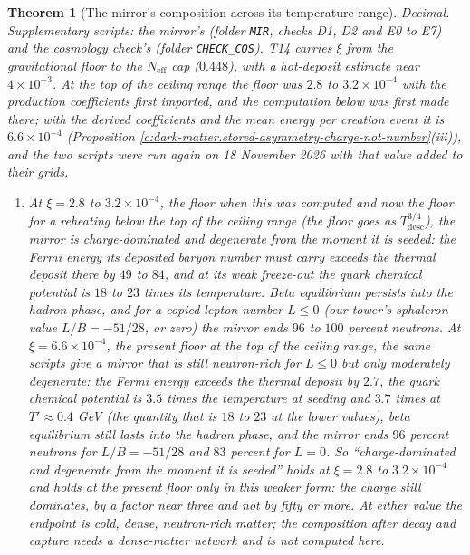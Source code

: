 \documentclass[11pt]{article}
\newtheorem{theorem}{Theorem}[section]
\theoremstyle{definition}
\theoremstyle{plain}
\newcommand{\changedmark}[2]{\marginpar{\raggedright\scriptsize\color{#1}#2}}
\providecommand{\Neff}{}\renewcommand{\Neff}{N_{\mathrm{eff}}}
\providecommand{\file}{}\renewcommand{\file}[1]{\texttt{#1}}
\begin{document}
\begin{theorem}[The mirror's composition across its temperature range]\label{c:dark-tower-matter.mirrors-composition}
\changedmark{BurntOrange}{changed since the deposit}
Decimal. Supplementary scripts: the mirror's (folder \file{MIR}, checks D1, D2 and E0 to E7) and the cosmology check's (folder \file{CHECK\_COS}). T14 carries $\xi$ from the gravitational floor to the $\Neff$ cap ($0.448$), with a hot-deposit estimate near $4 \times 10^{-3}$. At the top of the ceiling range the floor was $2.8$ to $3.2 \times 10^{-4}$ with the production coefficients first imported, and the computation below was first made there; with the derived coefficients and the mean energy per creation event it is $6.6 \times 10^{-4}$ (Proposition \ref{c:dark-matter.stored-asymmetry-charge-not-number}(iii)), and the two scripts were run again on 18 November 2026 with that value added to their grids.
\begin{enumerate}
\item[(i)] At $\xi = 2.8$ to $3.2 \times 10^{-4}$, the floor when this was computed and now the floor for a reheating below the top of the ceiling range (the floor goes as $T_{\mathrm{desc}}^{3/4}$), the mirror is charge-dominated and degenerate from the moment it is seeded: the Fermi energy its deposited baryon number must carry exceeds the thermal deposit there by $49$ to $84$, and at its weak freeze-out the quark chemical potential is $18$ to $23$ times its temperature. Beta equilibrium persists into the hadron phase, and for a copied lepton number $L \leq 0$ (our tower's sphaleron value $L/B = -51/28$, or zero) the mirror ends $96$ to $100$ percent neutrons. At $\xi = 6.6 \times 10^{-4}$, the present floor at the top of the ceiling range, the same scripts give a mirror that is still neutron-rich for $L \leq 0$ but only moderately degenerate: the Fermi energy exceeds the thermal deposit by $2.7$, the quark chemical potential is $3.5$ times the temperature at seeding and $3.7$ times at $T' \approx 0.4$ GeV (the quantity that is $18$ to $23$ at the lower values), beta equilibrium still lasts into the hadron phase, and the mirror ends $96$ percent neutrons for $L/B = -51/28$ and $83$ percent for $L = 0$. So ``charge-dominated and degenerate from the moment it is seeded'' holds at $\xi = 2.8$ to $3.2 \times 10^{-4}$ and holds at the present floor only in this weaker form: the charge still dominates, by a factor near three and not by fifty or more. At either value the endpoint is cold, dense, neutron-rich matter; the composition after decay and capture needs a dense-matter network and is not computed here.

\end{enumerate}
\end{theorem}
\end{document}
